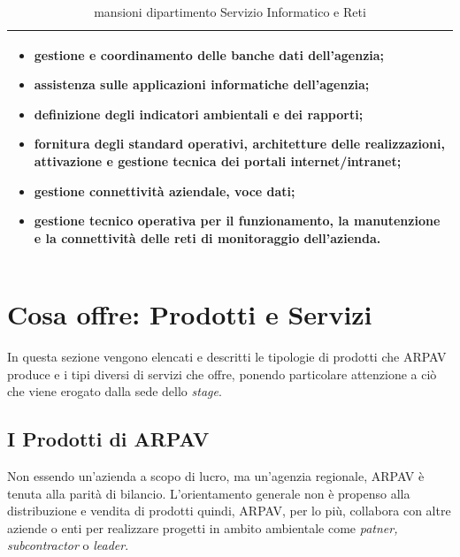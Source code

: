 \begin{table}[htbp]
\centering
\begin{tabular}{|p{}|}
\hline

\begin{itemize}

    \item gestione e coordinamento delle banche dati dell'agenzia;
	
	\item assistenza sulle applicazioni informatiche dell'agenzia;
	
	\item definizione degli indicatori ambientali e dei rapporti;
	
	\item fornitura degli standard operativi, architetture delle realizzazioni, attivazione e gestione tecnica dei portali internet/intranet;
	
	\item gestione connettività aziendale, voce dati;
	
	\item gestione tecnico operativa per il funzionamento, la manutenzione e la connettività delle reti di monitoraggio dell'azienda.
\end{itemize}
	\\
	
\hline
\end{tabular}
\caption{mansioni dipartimento Servizio Informatico e Reti}
\end{table}

\section{Cosa offre: Prodotti e Servizi}

In questa sezione vengono elencati e descritti le tipologie di prodotti che ARPAV produce e i tipi diversi di servizi che offre, ponendo particolare attenzione a ciò che viene erogato dalla sede dello \textit{stage}.

\subsection{I Prodotti di ARPAV}

Non essendo un'azienda a scopo di lucro, ma un'agenzia regionale, ARPAV è tenuta alla parità di bilancio. L'orientamento generale non è propenso alla distribuzione e vendita di prodotti quindi, ARPAV, per lo più, collabora con altre aziende o enti per realizzare progetti in ambito ambientale come \textit{patner, subcontractor} o \textit{leader}.



